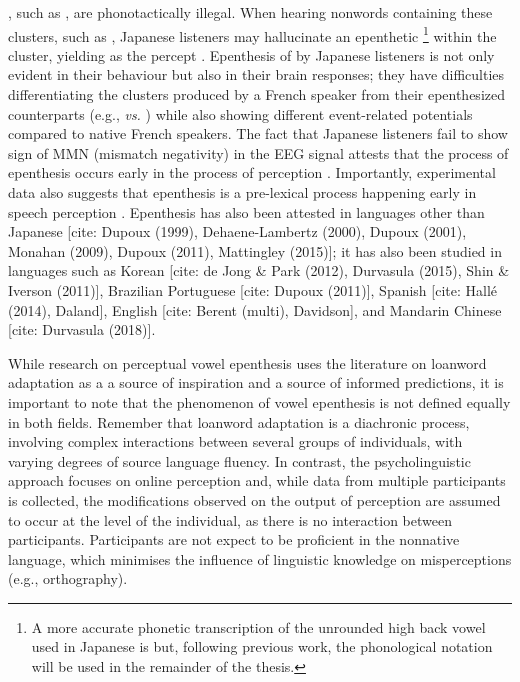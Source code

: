 , such as , are phonotactically illegal. When hearing nonwords containing these clusters, such as , Japanese listeners may hallucinate an epenthetic \footnote{A more accurate phonetic transcription of the unrounded high back vowel used in Japanese is \textipa{[W]} but, following previous work, the phonological notation  will be used in the remainder of the thesis.} within the cluster, yielding  as the percept \cite{dupoux1999}. Epenthesis of  by Japanese listeners is not only evident in their behaviour but also in their brain responses; they have difficulties differentiating the clusters produced by a French speaker from their epenthesized counterparts (e.g.,  \textit{vs.} ) while also showing different event-related potentials compared to native French speakers. The fact that Japanese listeners fail to show sign of MMN (mismatch negativity) in the EEG signal attests that the process of epenthesis occurs early in the process of perception \cite{dehaene2000}. Importantly, experimental data also suggests that epenthesis is a pre-lexical process happening early in speech perception \cite{dupoux2001}.
Epenthesis has also been attested in languages other than Japanese [cite: Dupoux (1999), Dehaene-Lambertz (2000), Dupoux (2001), Monahan (2009), Dupoux (2011), Mattingley (2015)]; it has also been studied in languages such as Korean [cite: de Jong \& Park (2012), Durvasula (2015), Shin \& Iverson (2011)], Brazilian Portuguese [cite: Dupoux (2011)], Spanish [cite: Hallé (2014), Daland], English [cite: Berent (multi), Davidson], and Mandarin Chinese [cite: Durvasula (2018)].

While research on perceptual vowel epenthesis uses the literature on loanword adaptation as a a source of inspiration and a source of informed predictions, it is important to note that the phenomenon of vowel epenthesis is not defined equally in both fields. Remember that loanword adaptation is a diachronic process, involving complex interactions between several groups of individuals, with varying degrees of source language fluency. 
In contrast, the psycholinguistic approach focuses on online perception and, while data from multiple participants is collected, the modifications observed on the output of perception are assumed to occur at the level of the individual, as there is no interaction between participants. Participants are not expect to be proficient in the nonnative language, which minimises the influence of linguistic knowledge on misperceptions (e.g., orthography). 

